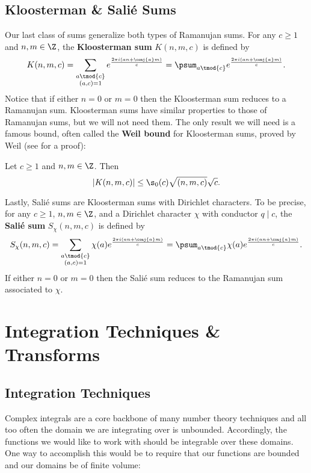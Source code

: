       \subsection*{Kloosterman \& Sali\'e Sums}
        Our last class of sums generalize both types of Ramanujan sums. For any $c \ge 1$ and $n,m \in \Z$, the \textbf{Kloosterman sum} $K(n,m,c)$ is defined by
        \[
          K(n,m,c) = \sum_{\substack{a \tmod{c} \\ (a,c) = 1}}e^{\frac{2\pi i(an+\conj{a}m)}{c}} = \psum_{a \tmod{c}}e^{\frac{2\pi i(an+\conj{a}m)}{c}}.
        \]
        Notice that if either $n = 0$ or $m = 0$ then the Kloosterman sum reduces to a Ramanujan sum. Kloosterman sums have similar properties to those of Ramanujan sums, but we will not need them. The only result we will need is a famous bound, often called the \textbf{Weil bound} for Kloosterman sums, proved by Weil (see \cite{weil1948some} for a proof):

        \begin{theorem}
          Let $c \ge 1$ and $n,m \in \Z$. Then
          \[
            |K(n,m,c)| \le \s_{0}(c)\sqrt{(n,m,c)}\sqrt{c}.
          \]
        \end{theorem}

        Lastly, Sali\'e sums are Kloosterman sums with Dirichlet characters. To be precise, for any $c \ge 1$, $n,m \in \Z$, and a Dirichlet character $\chi$ with conductor $q \mid c$, the \textbf{Sali\'e sum} $S_{\chi}(n,m,c)$ is defined by
        \[
          S_{\chi}(n,m,c) = \sum_{\substack{a \tmod{c} \\ (a,c) = 1}}\chi(a)e^{\frac{2\pi i(an+\conj{a}m)}{c}} = \psum_{a \tmod{c}}\chi(a)e^{\frac{2\pi i(an+\conj{a}m)}{c}}.
        \]
        If either $n = 0$ or $m = 0$ then the Sali\'e sum reduces to the Ramanujan sum associated to $\chi$.
    \section{Integration Techniques \& Transforms}
      \subsection*{Integration Techniques}
        Complex integrals are a core backbone of many number theory techniques and all too often the domain we are integrating over is unbounded. Accordingly, the functions we would like to work with should be integrable over these domains. One way to accomplish this would be to require that our functions are bounded and our domains be of finite volume:

